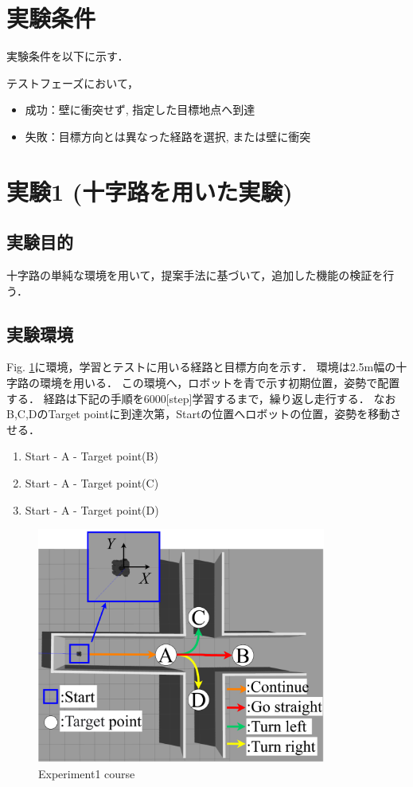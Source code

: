 \section{実験条件}
実験条件を以下に示す．

テストフェーズにおいて，
\begin{itemize}
  \item 成功：壁に衝突せず, 指定した目標地点へ到達
  \item 失敗：目標方向とは異なった経路を選択, または壁に衝突
\end{itemize}
\newpage
\section{実験1 (十字路を用いた実験)}
\subsection{実験目的}
十字路の単純な環境を用いて，提案手法に基づいて，追加した機能の検証を行う．
\subsection{実験環境}
Fig. \ref{fig::zyuzi}に環境，学習とテストに用いる経路と目標方向を示す．
環境は2.5m幅の十字路の環境を用いる．
この環境へ，ロボットを青で示す初期位置，姿勢で配置する．
経路は下記の手順を6000[step]学習するまで，繰り返し走行する．
なおB,C,DのTarget pointに到達次第，Startの位置へロボットの位置，姿勢を移動させる．
\begin{enumerate}
  \setlength{\parskip}{0cm} %
  \setlength{\itemsep}{0cm} %
  \item Start - A - Target point(B)
  \item Start - A - Target point(C)
  \item Start - A - Target point(D)
  \end{enumerate}

\begin{figure}[H]
    \centering
    \includegraphics[width = 9.5cm]{./figs/zyuziroute.pdf}
    \caption{Experiment1 course}
    \label{fig::zyuzi}
\end{figure}

